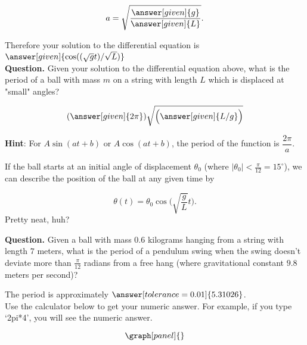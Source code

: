 \documentclass[handout,nooutcomes]{ximera}
\begin{document}
\begin{example}
\begin{explanation}
\[
a = \sqrt{\dfrac{\answer[given]{g}}{\answer[given]{L}}}.
\]


Therefore your solution to the differential equation is $\answer[given]{ \cos((\sqrt{g}t)/\sqrt{L})}$\\



\textbf{Question. } Given your solution to the differential equation above, what is the period of a ball with mass $m$ on a string with length $L$ which is displaced at "small" angles?

\[
(\answer[given]{2\pi})\sqrt{\Big(\answer[given]{L/g}\Big)}
\]
\medskip

\textbf{Hint}: For $A\sin(at+b)$ or $A\cos(at+b)$, the period of the 
function is $\dfrac{2\pi}{a}$.


If the ball starts at an initial angle of displacement $\theta_0$
(where $|\theta_0|<\frac{\pi}{12}= 15^\circ$), we can describe
the position of the ball at any given time by

\[
\theta(t) = \theta_0 \cos\Big(\sqrt{\frac{g}{L}} t\Big).
\]
Pretty neat, huh?


\textbf{Question. } Given a ball with mass $0.6$ kilograms hanging from a string with length $7$ meters, what is the period of a pendulum swing when the swing doesn't deviate more than $\frac{\pi}{12}$ radians from a free hang (where gravitational constant $9.8$ meters per second)?

The period is approximately $\answer[tolerance=0.01]{5.31026}$.\\

Use the calculator below to get your numeric answer. For example, if you type
`2pi*4', you will see the numeric answer.

\[
\graph[panel]{}
\]


\end{explanation}
\end{example}
\end{document}
